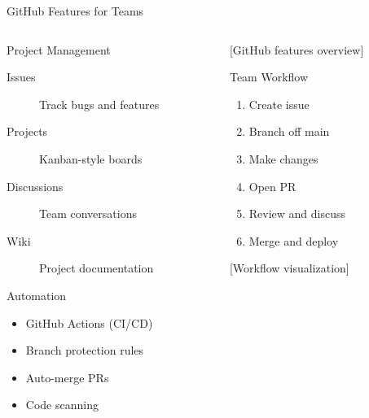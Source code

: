 \documentclass[aspectratio=169]{beamer}
\begin{document}
\begin{frame}{GitHub Features for Teams}
  \begin{columns}
    \begin{column}{0.45\textwidth}
      \begin{block}{Project Management}
        \begin{description}
          \item[Issues] Track bugs and features
          \item[Projects] Kanban-style boards
          \item[Discussions] Team conversations
          \item[Wiki] Project documentation
        \end{description}
      \end{block}
      
      \begin{block}{Automation}
        \begin{itemize}
          \item GitHub Actions (CI/CD)
          \item Branch protection rules
          \item Auto-merge PRs
          \item Code scanning
        \end{itemize}
      \end{block}
    \end{column}
    
    \begin{column}{0.5\textwidth}
      \begin{center}
        [GitHub features overview]
        
        \vspace{1em}
        \begin{exampleblock}{Team Workflow}
          \begin{enumerate}
            \item Create issue
            \item Branch off main
            \item Make changes
            \item Open PR
            \item Review and discuss
            \item Merge and deploy
          \end{enumerate}
        \end{exampleblock}
        
        \vspace{1em}
        [Workflow visualization]
      \end{center}
    \end{column}
  \end{columns}
\end{frame}
\end{document}

